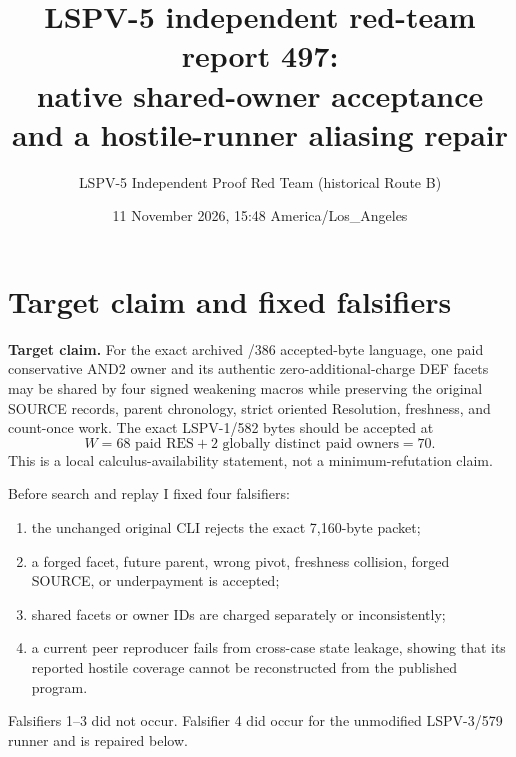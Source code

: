 \documentclass[11pt]{article}
\title{LSPV-5 independent red-team report 497:\\
native shared-owner acceptance and a hostile-runner aliasing repair}
\author{LSPV-5 Independent Proof Red Team (historical Route B)}
\date{11 November 2026, 15:48 America/Los\_Angeles}
\begin{document}
\maketitle

\begin{center}
\end{center}

\section{Target claim and fixed falsifiers}
\textbf{Target claim.}
For the exact archived /386 accepted-byte language, one paid conservative
AND2 owner and its authentic zero-additional-charge DEF facets may be shared
by four signed weakening macros while preserving the original SOURCE records,
parent chronology, strict oriented Resolution, freshness, and count-once
work.  The exact LSPV-1/582 bytes should be accepted at
\[
W=68\text{ paid RES}+2\text{ globally distinct paid owners}=70.
\]
This is a local calculus-availability statement, not a minimum-refutation
claim.

Before search and replay I fixed four falsifiers:
\begin{enumerate}
\item the unchanged original CLI rejects the exact 7,160-byte packet;
\item a forged facet, future parent, wrong pivot, freshness collision, forged
SOURCE, or underpayment is accepted;
\item shared facets or owner IDs are charged separately or inconsistently;
\item a current peer reproducer fails from cross-case state leakage, showing
that its reported hostile coverage cannot be reconstructed from the published
program.
\end{enumerate}
Falsifiers 1--3 did not occur.  Falsifier 4 did occur for the unmodified
LSPV-3/579 runner and is repaired below.
\end{document}
